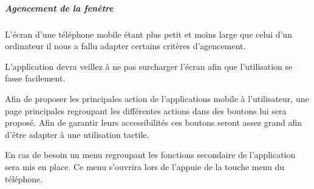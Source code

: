 \documentclass[etudiants]{support-iutrs}
\begin{document}
\subparagraph{Agencement de la fenêtre}
L’écran d'une téléphone mobile étant plus petit et moins large que celui d'un ordinateur il nous a fallu adapter certains critères d'agencement.

L'application devra veillez à ne pas surcharger l'écran afin que l'utilisation se fasse facilement.

  \begin{figure}[htbp]
  \begin{center}
    \leavevmode
    \hspace{4cm}
  \end{center}
\end{figure}

Afin de proposer les principales action de l'applications mobile à l’utilisateur, une page principales regroupant les différentes actions dans des boutons lui sera proposé.
Afin de garantir leurs accessibilités ces boutons seront assez grand afin d'être adapter à une utilisation tactile. 

En cas de besoin un menu regroupant les fonctions secondaire de l'application sera mis en place.
Ce menu s'ouvrira lors de l’appuie de la touche menu du téléphone. 
\end{document}
